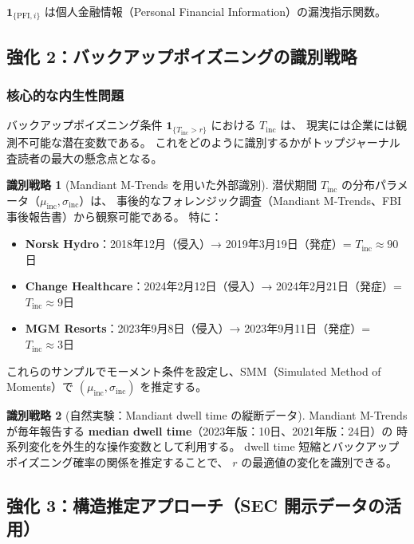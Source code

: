 \documentclass[a4paper,11pt]{article}
\newcommand{\ind}{\mathbf{1}}
\theoremstyle{definition}
\newtheorem{identification}{識別戦略}[section]
\begin{document}
$\ind_{\{\mathrm{PFI},i\}}$ は個人金融情報（Personal Financial Information）の漏洩指示関数。

\subsection{強化 2：バックアップポイズニングの識別戦略}

\subsubsection{核心的な内生性問題}

バックアップポイズニング条件 $\ind_{\{T_{\mathrm{inc}} > r\}}$ における $T_{\mathrm{inc}}$ は、
現実には企業には観測不可能な潜在変数である。
これをどのように識別するかがトップジャーナル査読者の最大の懸念点となる。

\begin{identification}[Mandiant M-Trends を用いた外部識別]
  潜伏期間 $T_{\mathrm{inc}}$ の分布パラメータ（$\mu_{\mathrm{inc}}, \sigma_{\mathrm{inc}}$）は、
  事後的なフォレンジック調査（Mandiant M-Trends、FBI事後報告書）から観察可能である。
  特に：
  \begin{itemize}[leftmargin=1.5em, itemsep=1pt]
    \item \textbf{Norsk Hydro}：2018年12月（侵入）→ 2019年3月19日（発症）= $T_{\mathrm{inc}} \approx 90$日
    \item \textbf{Change Healthcare}：2024年2月12日（侵入）→ 2024年2月21日（発症）= $T_{\mathrm{inc}} \approx 9$日
    \item \textbf{MGM Resorts}：2023年9月8日（侵入）→ 2023年9月11日（発症）= $T_{\mathrm{inc}} \approx 3$日
  \end{itemize}
  これらのサンプルでモーメント条件を設定し、SMM（Simulated Method of Moments）で
  $(\mu_{\mathrm{inc}}, \sigma_{\mathrm{inc}})$ を推定する。
\end{identification}

\begin{identification}[自然実験：Mandiant dwell time の縦断データ]
  Mandiant M-Trends が毎年報告する \textbf{median dwell time}（2023年版：10日、2021年版：24日）の
  時系列変化を外生的な操作変数として利用する。
  dwell time 短縮とバックアップポイズニング確率の関係を推定することで、
  $r$ の最適値の変化を識別できる。
\end{identification}

\subsection{強化 3：構造推定アプローチ（SEC 開示データの活用）}
\end{document}
